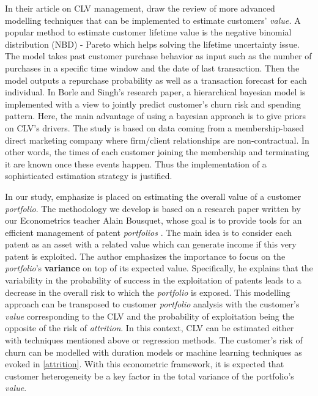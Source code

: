 \documentclass[
]{book}
\begin{document}
In their article on CLV management, \citet{CLV_MEASUREMENT} draw the review of more advanced modelling techniques that can be implemented to estimate customers' \emph{value.} A popular method to estimate customer lifetime value is the negative binomial distribution (NBD) - Pareto \citep{CLV_NBD} which helps solving the lifetime uncertainty issue. The model takes past customer purchase behavior as input such as the number of purchases in a specific time window and the date of last transaction. Then the model outputs a repurchase probability as well as a transaction forecast for each individual. In Borle and Singh's research paper, a hierarchical bayesian model is implemented with a view to jointly predict customer's churn risk and spending pattern. Here, the main advantage of using a bayesian approach is to give priors on CLV's drivers. The study is based on data coming from a membership-based direct marketing company where firm/client relationships are non-contractual. In other words, the times of each customer joining the membership and terminating it are known once these events happen. Thus the implementation of a sophisticated estimation strategy is justified.

In our study, emphasize is placed on estimating the overall value of a customer \emph{portfolio}. The methodology we develop is based on a research paper written by our Econometrics teacher Alain Bousquet, whose goal is to provide tools for an efficient management of patent \emph{portfolios} \citep{BREVETS}. The main idea is to consider each patent as an asset with a related value which can generate income if this very patent is exploited. The author emphasizes the importance to focus on the \emph{portfolio}'s \textbf{variance} on top of its expected value. Specifically, he explains that the variability in the probability of success in the exploitation of patents leads to a decrease in the overall risk to which the \emph{portfolio} is exposed. This modelling approach can be transposed to customer \emph{portfolio} analysis with the customer's \emph{value} corresponding to the CLV and the probability of exploitation being the opposite of the risk of \emph{attrition}. In this context, CLV can be estimated either with techniques mentioned above or regression methods. The customer's risk of churn can be modelled with duration models or machine learning techniques as evoked in \ref{attrition}. With this econometric framework, it is expected that customer heterogeneity be a key factor in the total variance of the portfolio's \emph{value}.
\end{document}
